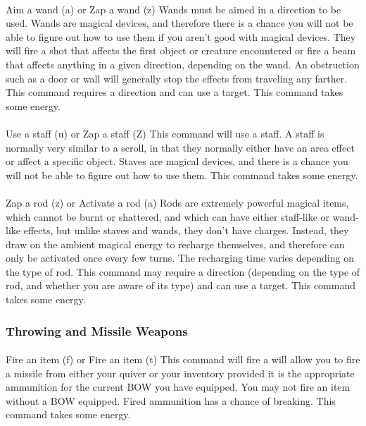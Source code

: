 \paragraph{}Aim a wand (a) or Zap a wand (z) Wands must be aimed in a
direction to be used. Wands are magical devices, and therefore there is
a chance you will not be able to figure out how to use them if you
aren't good with magical devices. They will fire a shot that affects the
first object or creature encountered or fire a beam that affects
anything in a given direction, depending on the wand. An obstruction
such as a door or wall will generally stop the effects from traveling
any farther. This command requires a direction and can use a target.
This command takes some energy.

\paragraph{}Use a staff (u) or Zap a staff (Z) This command will use a
staff. A staff is normally very similar to a scroll, in that they
normally either have an area effect or affect a specific object. Staves
are magical devices, and there is a chance you will not be able to
figure out how to use them.  This command takes some energy.
 
\paragraph{}Zap a rod (z) or Activate a rod (a) Rods are extremely
powerful magical items, which cannot be burnt or shattered, and which
can have either staff-like or wand-like effects, but unlike staves and
wands, they don't have charges.  Instead, they draw on the ambient
magical energy to recharge themselves, and therefore can only be
activated once every few turns. The recharging time varies depending on
the type of rod.  This command may require a direction (depending on the
type of rod, and whether you are aware of its type) and can use a
target.  This command takes some energy.

\subsubsection{Throwing and Missile Weapons} 
\paragraph{}Fire an item
(f) or Fire an item (t) This command will fire a will allow you to fire
a missile from either your quiver or your inventory provided it is the
appropriate ammunition for the current BOW you have equipped.  You may
not fire an item without a BOW equipped. Fired ammunition has a chance
of breaking. This command takes some energy.

